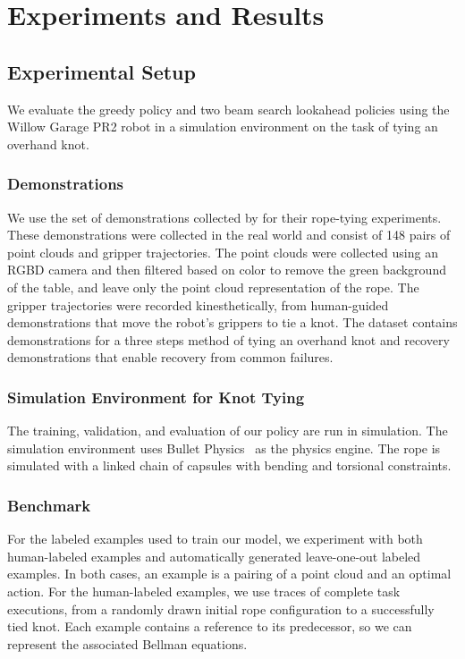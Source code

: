 \section{Experiments and Results}
\label{sec:experiments}

\subsection{Experimental Setup}
We evaluate the greedy policy and two beam search lookahead policies using the Willow Garage PR2 robot in a simulation environment on the task of tying an overhand knot.

\subsubsection{Demonstrations}
We use the set of demonstrations collected by \citet{Schulmanetal_ISRR2013} for their rope-tying experiments.
These demonstrations were collected in the real world and consist of 148 pairs of point clouds and gripper trajectories.
The point clouds were collected using an RGBD camera and then filtered based on color to remove the green background of the table, and leave only the point cloud representation of the rope.
The gripper trajectories were recorded kinesthetically, from human-guided demonstrations that move the robot's grippers to tie a knot.
The dataset contains demonstrations for a three steps method of tying an overhand knot and recovery demonstrations that
enable recovery from common failures.

\subsubsection{Simulation Environment for Knot Tying} 
The training, validation, and evaluation of our policy are run in simulation.
The simulation environment uses Bullet Physics~\cite{Bullet_Physics} as the physics engine.
The rope is simulated with a linked chain of capsules with bending and torsional constraints.

\subsubsection{Benchmark}
For the labeled examples  used to train our \mmql{} model, we experiment with both human-labeled examples 
and automatically generated leave-one-out labeled examples.
In both cases, an example is a pairing of a point cloud and an optimal action.
For the human-labeled examples, we use traces of complete task executions, from a randomly drawn initial 
rope configuration to a successfully tied knot.
Each example contains a reference to its predecessor, so we can represent the associated Bellman equations.

